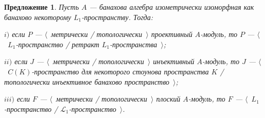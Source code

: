 \documentclass[12pt]{article}
\newtheorem{proposition}[theorem]{Предложение}
\begin{document}
\begin{proposition}\label{TopProjInjFlatModOverL1Charac} Пусть $A$ --- банахова алгебра изометрически изоморфная как банахово некоторому $L_1$-пространству. Тогда:

$i)$ если $P$ --- $\langle$~метрически / топологически~$\rangle$ проективный $A$-модуль, то $P$ --- $\langle$~$L_1$-пространство / ретракт $L_1$-пространства~$\rangle$;

$ii)$ если $J$ --- $\langle$~метрически / топологически~$\rangle$ инъективный $A$-модуль, то $J$ --- $\langle$~$C(K)$-пространство для некоторого стоунова пространства $K$ / топологически инъективное банахово пространство~$\rangle$;

$iii)$ если $F$ --- $\langle$~метрически / топологически~$\rangle$ плоский $A$-модуль, то $F$ --- $\langle$~$L_1$-пространство / $\mathscr{L}_1$-пространство~$\rangle$.
\end{proposition}
\end{document}
